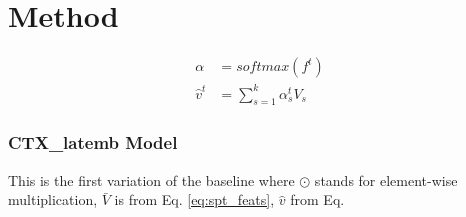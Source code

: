 \chapter{Method}

\begin{align}
\alpha &= softmax(f^t) \label{eq:alpha} \\
\hat{v}^t &= \sum_{s=1}^k  \alpha_s^t V_s \label{eq:vhat} 
\end{align}

\subsection{CTX\_latemb Model}\label{sec: sub_latectx}
This is the first variation of the baseline 
where $\odot$ stands for element-wise multiplication,  $\bar{V}$ is from Eq. \ref{eq:spt_feats}, $\hat{v}$ from Eq. 